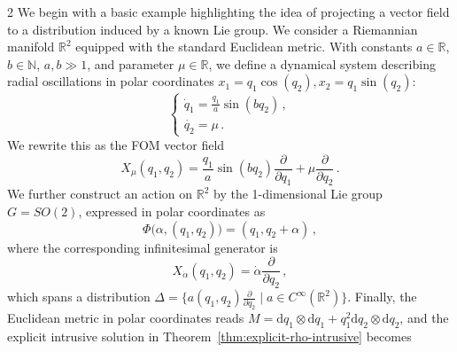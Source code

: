\documentclass{article}
\newcommand{\R}{\mathbb{R}}                                 %
\newcommand{\ext}{\text{d}}                                 %
\newcommand{\der}[2][3]{\frac{\partial{#1}}{\partial{#2}}}
\begin{document}
\begin{multicols}{2}
We begin with a basic example highlighting the idea of projecting a vector field to a distribution induced by a known Lie group.
We consider a Riemannian manifold $\R^2$ equipped with the standard Euclidean metric. With constants $a \in \R$, $b \in \mathbb{N}$, $a,b \gg 1$, and parameter $\mu \in \R$, we define a dynamical system describing radial oscillations in polar coordinates $x_1 = q_1\cos(q_2), x_2 = q_1 \sin(q_2)$:
\begin{equation} 
    \begin{cases} 
        \dot{q}_1 = \frac{q_1}{a}\sin(b q_2)\,, \\ 
        \dot{q_2} = \mu \,.
    \end{cases}
\end{equation}
We rewrite this as the FOM vector field
\begin{equation}
    X_\mu(q_1,q_2) = \frac{q_1}{a}\sin(bq_2) \der[]{q_1} + \mu\der[]{q_2}\,.
\end{equation}
We further construct an action on $\R^2$ by the 1-dimensional Lie group $G = SO(2)$, expressed in polar coordinates as 
\begin{equation}
    \Phi\big(\alpha,(q_1,q_2)) = (q_1,q_2+\alpha)\,,
\end{equation}
where the corresponding infinitesimal generator is
\begin{equation}
    X_{\dot{\alpha}}(q_1,q_2) = \dot{\alpha}\der[]{q_2} \,,
\end{equation}
which spans a distribution $\Delta = \{a(q_1,q_2)\der[]{q_2}\;|\; a \in C^\infty(\R^2)  \}$.
%
Finally, the Euclidean metric in polar coordinates reads $M = \ext q_1 \otimes \ext q_1 + q_1^2 \ext q_2 \otimes \ext q_2$, and the explicit intrusive solution in Theorem~\ref{thm:explicit-rho-intrusive} becomes 

\end{multicols}
\end{document}
